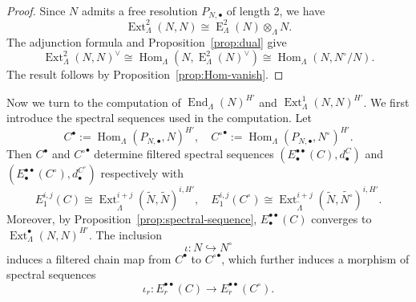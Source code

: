 \documentclass[11pt,a4paper]{article} %
\def\E{\operatorname{E}}
\def\End{\operatorname{End}}
\def\Ext{\operatorname{Ext}} %
\def\Hom{\operatorname{Hom}}
\begin{document}
\begin{proof}
    Since $N$ admits a free resolution $P_{N,\bullet}$ of length 2, we have
    \[
    \Ext_{\Lambda}^2(N,N)\cong\E_{\Lambda}^2(N)\otimes_\Lambda N.
    \]
    The adjunction formula and Proposition~\ref{prop:dual} give
    \[
    \Ext_{\Lambda}^2(N,N)^\vee\cong\Hom_\Lambda\left(N,\E_{\Lambda}^2(N)^\vee\right)\cong\Hom_\Lambda(N,N^\circ/N).
    \]
    The result follows by Proposition~\ref{prop:Hom-vanish}.
\end{proof}

Now we turn to the computation of $\End_{\Lambda}(N)^{H'}$ and $\Ext_{\Lambda}^1(N,N)^{H'}$. We first introduce the spectral sequences used in the computation. Let 
\[
C^\bullet:=\Hom_\Lambda(P_{N,\bullet},N)^{H'},\quad{C^\circ}^\bullet:=\Hom_\Lambda(P_{N,\bullet},N^\circ)^{H'}.
\]
Then $C^\bullet$ and ${C^\circ}^\bullet$ determine filtered spectral sequences $\left(E_\bullet^{\bullet\bullet}(C),d_\bullet^C\right)$ and $\left(E_\bullet^{\bullet\bullet}(C^\circ),d_\bullet^{C^\circ}\right)$ respectively with 
\[
E_1^{i,j}(C)\cong\Ext_{\widetilde{\Lambda}}^{i+j}(\widetilde{N},\widetilde{N})^{i,H'},\quad E_1^{i,j}(C^\circ)\cong\Ext_{\widetilde{\Lambda}}^{i+j}(\widetilde{N},\widetilde{N^\circ})^{i,H'}.
\]
Moreover, by Proposition~\ref{prop:spectral-sequence}, $E_\bullet^{\bullet\bullet}(C)$ converges to $\Ext^\bullet_{\Lambda}(N,N)^{H'}$. The inclusion
\[
\iota:N\hookrightarrow N^\circ
\]
induces a filtered chain map from $C^\bullet$ to ${C^\circ}^\bullet$, which further induces a morphism of spectral sequences 
\[
\iota_r:E_r^{\bullet\bullet}(C)\longrightarrow E_r^{\bullet\bullet}(C^\circ).
\]



\end{document}
